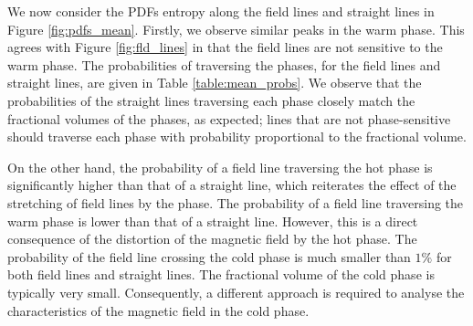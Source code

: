 \documentclass[useAMS,usenatbib]{mn2e}
\begin{document}
We now consider the PDFs entropy along the field lines and straight lines 
in Figure \ref{fig:pdfs_mean}. 
Firstly, we observe similar peaks in the warm phase. 
This agrees with Figure \ref{fig:fld_lines} in that the field lines are 
not sensitive to the warm phase. 
The probabilities of traversing the phases, for the field lines and straight 
lines, are given in Table \ref{table:mean_probs}. 
We observe that the probabilities of the straight lines traversing each phase
closely match the fractional volumes of the phases, as expected; lines that 
are not phase-sensitive should traverse each phase with probability 
proportional to the fractional volume. 

On the other hand, the probability of a field line traversing the hot phase
is significantly higher than that of a straight line, which reiterates the 
effect of the stretching of field lines by the phase. 
The probability of a field line traversing the warm phase is lower than that 
of a straight line. 
However, this is a direct consequence of the distortion of the magnetic field 
by the hot phase. 
The probability of the field line crossing the cold phase is much smaller than
$1\%$ for both field lines and straight lines. 
The fractional volume of the cold phase is typically very small. 
Consequently, a different approach is required to analyse the characteristics
of the magnetic field in the cold phase.
\end{document}
